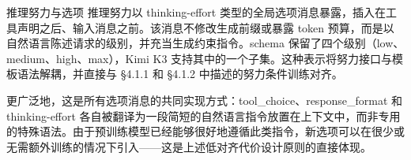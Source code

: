 \documentclass[
  10
]{article}
\begin{document}
推理努力与选项 推理努力以 thinking-effort 类型的全局选项消息暴露，插入在工具声明之后、输入消息之前。该消息不修改生成前缀或暴露 token 预算，而是以自然语言陈述请求的级别，并充当生成约束指令。schema 保留了四个级别（low、medium、high、max），Kimi K3 支持其中的一个子集。这种表示将努力接口与模板语法解耦，并直接与 §4.1.1 和 §4.1.2 中描述的努力条件训练对齐。

更广泛地，这是所有选项消息的共同实现方式：tool\_choice、response\_format 和 thinking-effort 各自被翻译为一段简短的自然语言指令放置在上下文中，而非专用的特殊语法。由于预训练模型已经能够很好地遵循此类指令，新选项可以在很少或无需额外训练的情况下引入——这是上述低对齐代价设计原则的直接体现。
\end{document}
